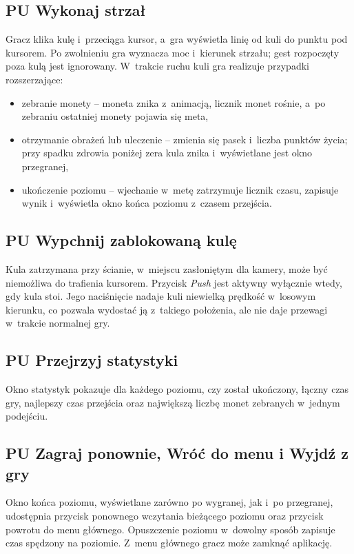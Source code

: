 \subsection{PU Wykonaj strzał}

Gracz klika kulę i~przeciąga kursor, a~gra wyświetla linię od kuli do punktu pod kursorem.
Po zwolnieniu gra wyznacza moc i~kierunek strzału; gest rozpoczęty poza kulą jest
ignorowany. W~trakcie ruchu kuli gra realizuje przypadki rozszerzające:
\begin{itemize}[leftmargin=1.9cm, itemsep=1pt]
  \item zebranie monety -- moneta znika z~animacją, licznik monet rośnie, a~po zebraniu
        ostatniej monety pojawia się meta,
  \item otrzymanie obrażeń lub uleczenie -- zmienia się pasek i~liczba punktów życia;
        przy spadku zdrowia poniżej zera kula znika i~wyświetlane jest okno przegranej,
  \item ukończenie poziomu -- wjechanie w~metę zatrzymuje licznik czasu, zapisuje wynik
        i~wyświetla okno końca poziomu z~czasem przejścia.
\end{itemize}

\subsection{PU Wypchnij zablokowaną kulę}

Kula zatrzymana przy ścianie, w~miejscu zasłoniętym dla kamery, może być niemożliwa do
trafienia kursorem. Przycisk \emph{Push} jest aktywny wyłącznie wtedy, gdy kula stoi.
Jego naciśnięcie nadaje kuli niewielką prędkość w~losowym kierunku, co pozwala wydostać ją
z~takiego położenia, ale nie daje przewagi w~trakcie normalnej gry.

\subsection{PU Przejrzyj statystyki}

Okno statystyk pokazuje dla każdego poziomu, czy został ukończony, łączny czas gry,
najlepszy czas przejścia oraz największą liczbę monet zebranych w~jednym podejściu.

\subsection{PU Zagraj ponownie, Wróć do menu i Wyjdź z gry}

Okno końca poziomu, wyświetlane zarówno po wygranej, jak i~po przegranej, udostępnia
przycisk ponownego wczytania bieżącego poziomu oraz przycisk powrotu do menu głównego.
Opuszczenie poziomu w~dowolny sposób zapisuje czas spędzony na poziomie. Z~menu głównego
gracz może zamknąć aplikację.


